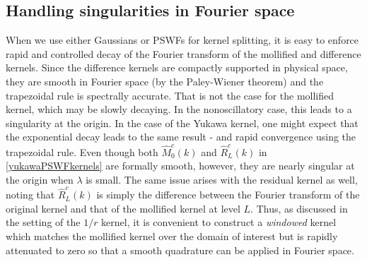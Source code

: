 \documentclass[final,letterpaper]{siamart171218}
\begin{document}
\subsection{Handling singularities in Fourier space}

When we use either Gaussians or PSWFs for kernel splitting, it is easy to 
enforce rapid and controlled decay of the Fourier transform
of the mollified and difference kernels. 
Since the difference kernels are compactly supported in physical space, they  
are smooth in Fourier space (by the Paley-Wiener theorem)
and the trapezoidal rule is spectrally accurate.
That is not the case for the mollified kernel, which may be slowly decaying. In the
nonoscillatory case, this leads to a singularity at the origin.
In the case of the Yukawa kernel, one might expect that the exponential decay leads
to the same result - and rapid convergence using the trapezoidal rule. Even
though both $\hat{M}_{0}^c(k)$ and $\hat{R}^c_L(k)$ in \cref{yukawaPSWFkernels} 
are formally smooth, however, they are nearly singular at the origin when $\lambda$ is small.
The same issue arises with the residual kernel as well, noting that
$\hat{R}^c_L(k)$ is simply the difference between the Fourier transform
of the original kernel and that of the mollified kernel at level $L$. 
Thus, as discussed in the setting of the $1/r$ kernel, it is convenient to construct
a {\em windowed} kernel which matches the mollified kernel over the domain of interest but 
is rapidly attenuated to zero so that a smooth quadrature can be applied in Fourier space. 
\end{document}
